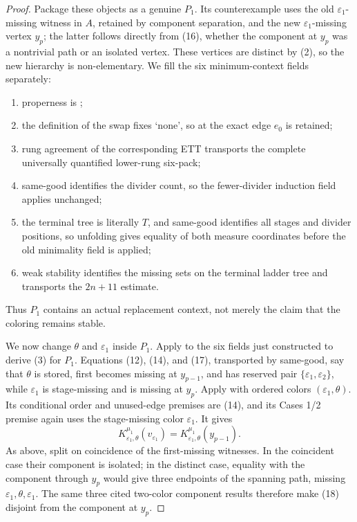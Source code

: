\begin{proof}
Package these objects as a genuine
 \(P_1\).  Its counterexample
uses the old \(\varepsilon_1\)-missing witness in \(A\), retained by
component separation, and the new \(\varepsilon_1\)-missing vertex
\(y_p\); the latter follows directly from (16), whether the component at
\(y_p\) was a nontrivial path or an isolated vertex.  These vertices are
distinct by (2), so the new hierarchy is non-elementary.  We fill the six
minimum-context fields separately:
\begin{enumerate}
\item properness is ;
\item the definition of the swap fixes `none', so
       at the exact edge \(e_0\) is retained;
\item rung agreement of the corresponding ETT transports the complete
      universally quantified lower-rung six-pack;
\item same-good identifies the divider count, so the fewer-divider
      induction field applies unchanged;
\item the terminal tree is literally \(T\), and same-good identifies
      all stages and divider positions, so unfolding
       gives equality of both
      measure coordinates before the old minimality field is applied;
\item weak stability identifies the missing sets on the terminal ladder
      tree and transports the \(2n+11\) estimate.
\end{enumerate}
Thus \(P_1\) contains an actual replacement context, not merely the
claim that the coloring remains stable.

We now change \(\theta\) and \(\varepsilon_1\) inside \(P_1\).  Apply
 to the six fields
just constructed to derive (3) for \(P_1\).  Equations (12), (14), and
(17), transported by same-good, say that \(\theta\) is stored, first
becomes missing at \(y_{p-1}\), and has reserved pair
\(\{\varepsilon_1,\varepsilon_2\}\), while
\(\varepsilon_1\) is stage-missing and is missing at \(y_p\).
Apply  with ordered colors
\((\varepsilon_1,\theta)\).  Its conditional order and unused-edge
premises are (14), and its Cases 1/2 premise again uses the stage-missing
color \(\varepsilon_1\).  It gives
\[
 K^{\mu_1}_{\varepsilon_1,\theta}(v_{\varepsilon_1})
       =K^{\mu_1}_{\varepsilon_1,\theta}(y_{p-1}).            \tag{18}
\]
As above, split on coincidence of the first-missing witnesses.  In the
coincident case their component is isolated; in the distinct case,
equality with the component through \(y_p\) would give three endpoints
of the spanning path, missing \(\varepsilon_1,\theta,\varepsilon_1\).
The same three cited two-color component results therefore make (18)
disjoint from the component at \(y_p\).


\end{proof}
